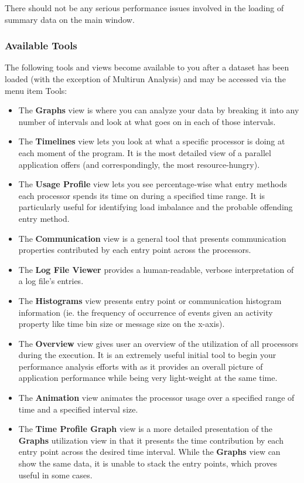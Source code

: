 \documentclass[10pt]{article}
\begin{document}
There should not be any serious performance issues involved in the
loading of summary data on the main window.

\subsubsection{Available Tools}
\label{sec::available tools}

The following tools and views become available to you after a dataset
has been loaded (with the exception of Multirun Analysis) and may be
accessed via the menu item Tools:

\begin{itemize}
\item 
The {\bf Graphs} view is where you can analyze your data by breaking it
into any number of intervals and look at what goes on in each of those
intervals.
\item
The {\bf Timelines} view lets you look at what a specific processor is
doing at each moment of the program. It is the most detailed view of a
parallel application \projections{} offers (and correspondingly, the
most resource-hungry).
\item
The {\bf Usage Profile} view lets you see percentage-wise what entry
methods each processor spends its time on during a specified time range.
It is particularly useful for identifying load imbalance and the probable
offending entry method.
\item
The {\bf Communication} view is a general tool that presents
communication properties contributed by each entry point across the
processors.
\item
The {\bf Log File Viewer} provides a human-readable, verbose
interpretation of a log file's entries.
\item
The {\bf Histograms} view presents entry point or communication
histogram information (ie. the frequency of occurrence of events given
an activity property like time bin size or message size on the
x-axis).
\item
The {\bf Overview} view gives user an overview of the utilization of
all processors during the execution. It is an extremely useful initial
tool to begin your performance analysis efforts with as it provides an
overall picture of application performance while being very
light-weight at the same time.
\item
The {\bf Animation} view animates the processor usage over a specified
range of time and a specified interval size.
\item
The {\bf Time Profile Graph} view is a more detailed presentation of
the {\bf Graphs} utilization view in that it presents the time
contribution by each entry point across the desired time
interval. While the {\bf Graphs} view can show the same data, it is
unable to stack the entry points, which proves useful in some cases.
\end{itemize}
\end{document}
